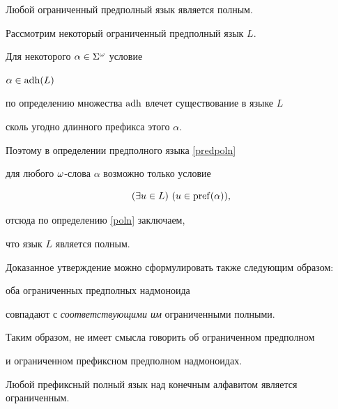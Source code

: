  \begin{props} \label{OPisP}


Любой ограниченный предполный язык является полным.


 \end{props}





\begin{pf}


 Рассмотрим некоторый ограниченный предполный язык $L$.


 Для некоторого $\alpha\in\Sigma^\omega$ условие


$\alpha\in\operatorname{adh}(L)$


 по определению множества $\operatorname{adh}$ влечет существование в языке $L$


 сколь угодно длинного префикса этого $\alpha$.


 Поэтому в определении предполного языка \ref{predpoln}


 для любого $\omega$-слова $\alpha$ возможно только условие


 $$


 (\exists u\in L)\ (u\in\pref(\alpha)),


 $$


отсюда по определению \ref{poln} заключаем,


 что язык $L$ является полным.


\end{pf}





Доказанное утверждение можно сформулировать также следующим образом:


 оба ограниченных предполных надмоноида


 совпадают с {\it соответствующими им\/} ограниченными полными.


 Таким образом, не имеет смысла говорить об ограниченном предполном


 и ограниченном префиксном предполном надмоноидах.





 \begin{props} \label{PPisO}


 Любой префиксный полный язык над конечным алфавитом является ограниченным.


 \end{props}






